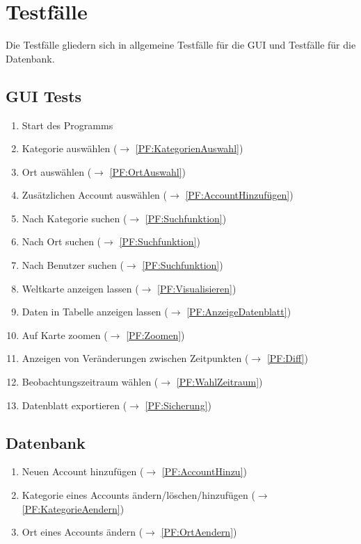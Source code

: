 
\section{Testfälle}

Die Testfälle gliedern sich in allgemeine Testfälle für die GUI und Testfälle für die Datenbank.

	\subsection{GUI Tests}
	\begin{enumerate}[align=left, leftmargin=4em, label={\textbf{\textbackslash T10\arabic*0\textbackslash}} ]
	\item Start des Programms
	\item Kategorie auswählen ($\rightarrow$ \ref{PF:KategorienAuswahl})
	\item Ort auswählen ($\rightarrow$ \ref{PF:OrtAuswahl})
	\item Zusätzlichen Account auswählen ($\rightarrow$ \ref{PF:AccountHinzufügen})
	\item Nach Kategorie suchen ($\rightarrow$ \ref{PF:Suchfunktion})
	\item Nach Ort suchen ($\rightarrow$ \ref{PF:Suchfunktion})
	\item Nach Benutzer suchen ($\rightarrow$ \ref{PF:Suchfunktion})
	\item Weltkarte anzeigen lassen ($\rightarrow$ \ref{PF:Visualisieren})
	\item Daten in Tabelle anzeigen lassen ($\rightarrow$ \ref{PF:AnzeigeDatenblatt})
	\item Auf Karte zoomen ($\rightarrow$ \ref{PF:Zoomen})
	\item Anzeigen von Veränderungen zwischen Zeitpunkten ($\rightarrow$ \ref{PF:Diff})
	\item Beobachtungszeitraum wählen ($\rightarrow$ \ref{PF:WahlZeitraum})
	\item Datenblatt exportieren ($\rightarrow$ \ref{PF:Sicherung}) 
	
	\end{enumerate}
	
	\subsection{Datenbank}
	\begin{enumerate}[align=left, leftmargin=4em, label={\textbf{\textbackslash T20\arabic*0\textbackslash}} ]
		\item Neuen Account hinzufügen ($\rightarrow$ \ref{PF:AccountHinzu})
		\item Kategorie eines Accounts ändern/löschen/hinzufügen ($\rightarrow$ \ref{PF:KategorieAendern})
		\item Ort eines Accounts ändern ($\rightarrow$ \ref{PF:OrtAendern})
	\end{enumerate}

